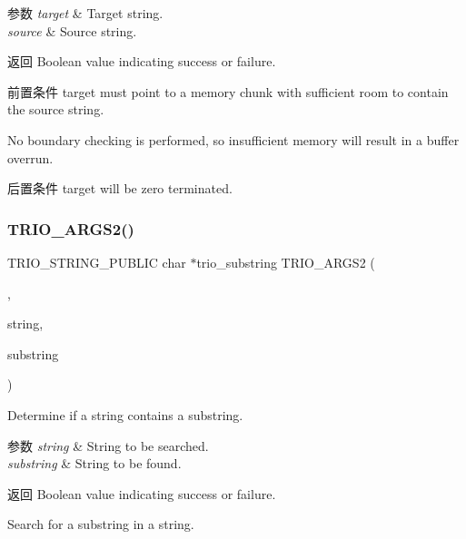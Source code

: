 \begin{DoxyParams}{参数}
{\em target} & Target string. \\
\hline
{\em source} & Source string. \\
\hline
\end{DoxyParams}
\begin{DoxyReturn}{返回}
Boolean value indicating success or failure.
\end{DoxyReturn}
\begin{DoxyPrecond}{前置条件}
{\ttfamily target} must point to a memory chunk with sufficient room to contain the {\ttfamily source} string. 

No boundary checking is performed, so insufficient memory will result in a buffer overrun. 
\end{DoxyPrecond}
\begin{DoxyPostcond}{后置条件}
{\ttfamily target} will be zero terminated. 
\end{DoxyPostcond}
\mbox{\label{group___static_strings_ga6284f500a4a0ad10d0507a968b645c1d}} 
\subsubsection{\texorpdfstring{T\+R\+I\+O\+\_\+\+A\+R\+G\+S2()}{TRIO\_ARGS2()}\hspace{0.1cm}{\footnotesize\ttfamily [2/9]}}
{\footnotesize\ttfamily T\+R\+I\+O\+\_\+\+S\+T\+R\+I\+N\+G\+\_\+\+P\+U\+B\+L\+IC char $\ast$trio\+\_\+substring T\+R\+I\+O\+\_\+\+A\+R\+G\+S2 (\begin{DoxyParamCaption}\item[{(\hyperlink{structstring}{string}, substring)}]{,  }\item[{T\+R\+I\+O\+\_\+\+C\+O\+N\+ST char $\ast$}]{string,  }\item[{T\+R\+I\+O\+\_\+\+C\+O\+N\+ST char $\ast$}]{substring }\end{DoxyParamCaption})}

Determine if a string contains a substring.


\begin{DoxyParams}{参数}
{\em string} & String to be searched. \\
\hline
{\em substring} & String to be found. \\
\hline
\end{DoxyParams}
\begin{DoxyReturn}{返回}
Boolean value indicating success or failure.
\end{DoxyReturn}
Search for a substring in a string.


